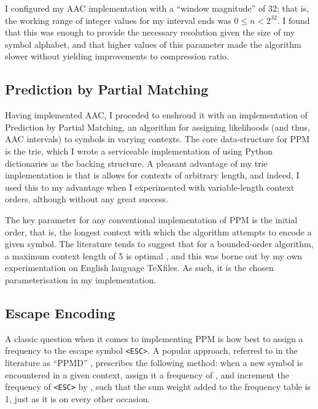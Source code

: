 \documentclass[11pt]{article}
\newcommand{\code}[1]{\texttt{#1}}
\begin{document}
I configured my AAC implementation with a \enquote{window magnitude} of 32; that is, the working range of integer values for my interval ends was $0 \leq n < 2^{32}$. I found that this was enough to provide the necessary resolution given the size of my symbol alphabet, and that higher values of this parameter made the algorithm slower without yielding improvements to compression ratio.

\subsection{Prediction by Partial Matching}

Having implemented AAC, I proceded to enshroud it with an implementation of Prediction by Partial Matching, an algorithm for assigning likelihoods (and thus, AAC intervals) to symbols in varying contexts. The core data-structure for PPM is the trie, which I wrote a serviceable implementation of using Python dictionaries as the backing structure. A pleasant advantage of my trie implementation is that is allows for contexts of arbitrary length, and indeed, I used this to my advantage when I experimented with variable-length context orders, although without any great success.

The key parameter for any conventional implementation of PPM is the initial order, that is, the longest context with which the algorithm attempts to encode a given symbol. The literature tends to suggest that for a bounded-order algorithm, a maximum context length of 5 is optimal \cite{cleary1997unbounded}, and this was borne out by my own experimentation on English language \TeX \thinspace files. As such, it is the chosen parameterisation in my implementation.

\subsection{Escape Encoding}

A classic question when it comes to implementing PPM is how best to assign a frequency to the escape symbol \code{<ESC>}. A popular approach, referred to in the literature as \enquote{PPMD} \cite{howard1992practical}, prescribes the following method: when a new symbol is encountered in a given context, assign it a frequency of , and increment the frequency of \code{<ESC>} by , such that the sum weight added to the frequency table is 1, just as it is on every other occasion.
\end{document}
